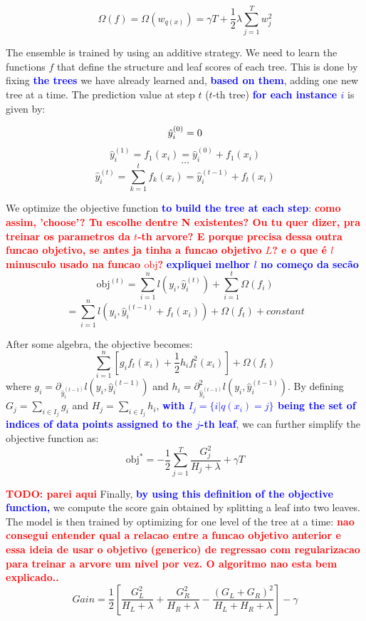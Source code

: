 \documentclass[cic,tc,english]{iiufrgs}
\newcommand{\bruno}[1]{\textcolor{red}{\textbf{#1}}}
\newcommand{\adriano}[1]{\textcolor{blue}{\textbf{#1}}}
\begin{document}
$$\Omega(f) = \Omega(w_{q(x)}) = \gamma T + \frac{1}{2}\lambda \sum_{j=1}^T w_j^2$$


The ensemble is trained by using an additive strategy. We need to learn the functions $f$ that define the structure and leaf scores of each tree. This is done by fixing \adriano{the trees} we have already learned and, \adriano{based on them}, adding one new tree at a time. The prediction value at step $t$ ($t$-th tree) \adriano{for each instance $i$} is given by:

$$
\hat{y}_i^{(0)} = 0\\
$$
$$
\hat{y}_i^{(1)} = f_1(x_i) = \hat{y}_i^{(0)} + f_1(x_i)
$$
$$
\dots
$$
$$
\hat{y}_i^{(t)} = \sum_{k=1}^t f_k(x_i)= \hat{y}_i^{(t-1)} + f_t(x_i)
$$

We optimize the objective function \adriano{to build the tree at each step}: \bruno{como assim, 'choose'? Tu escolhe dentre N existentes? Ou tu quer dizer, pra treinar os parametros da $t$-th arvore? E porque precisa dessa outra funcao objetivo, se antes ja tinha a funcao objetivo $L$? e o que é $l$ minusculo usado na funcao $\mbox{obj}$?} \adriano{expliquei melhor $l$ no começo da secão}
$$
\text{obj}^{(t)} = \sum_{i=1}^n l(y_i, \hat{y}_i^{(t)}) + \sum_{i=1}^t\Omega(f_i)
$$
$$
= \sum_{i=1}^n l(y_i, \hat{y}_i^{(t-1)} + f_t(x_i)) + \Omega(f_t) + constant
$$

After some algebra, the objective becomes:
$$
\sum_{i=1}^n [g_i f_t(x_i) + \frac{1}{2} h_i f_t^2(x_i)] + \Omega(f_t)
$$
\noindent where $g_i = \partial_{\hat{y}_i^{(t-1)}} l(y_i, \hat{y}_i^{(t-1)})$ and $h_i = \partial_{\hat{y}_i^{(t-1)}}^2 l(y_i, \hat{y}_i^{(t-1)})$. By defining $G_j = \sum_{i\in I_j} g_i$ and $H_j = \sum_{i\in I_j} h_i$, \adriano{with $I_j = \{i|q(x_i)=j\}$ being the set of indices of data points assigned to the $j$-th leaf}, we can further simplify the objective function as:
$$
\text{obj}^\ast = -\frac{1}{2} \sum_{j=1}^T \frac{G_j^2}{H_j+\lambda} + \gamma T
$$

\bruno{TODO: parei aqui}
Finally, \adriano{by using this definition of the objective function,} we compute the score gain obtained by splitting a leaf into two leaves. The model is then trained by optimizing for one level of the tree at a time: \bruno{nao consegui entender qual a relacao entre a funcao objetivo anterior e essa ideia de usar o objetivo (generico) de regressao com regularizacao para treinar a arvore um nivel por vez. O algoritmo nao esta bem explicado..}
$$
Gain = \frac{1}{2} \left[\frac{G_L^2}{H_L+\lambda}+\frac{G_R^2}{H_R+\lambda}-\frac{(G_L+G_R)^2}{H_L+H_R+\lambda}\right] - \gamma
$$
\end{document}
